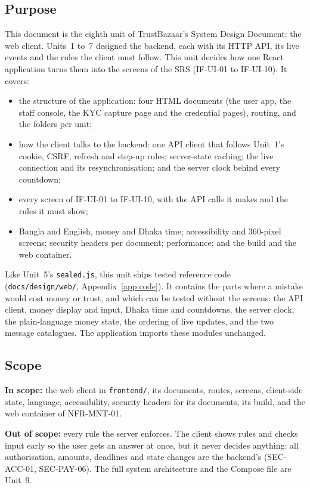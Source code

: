\documentclass[11pt,a4paper]{article}
\begin{document}
\subsection{Purpose}
This document is the eighth unit of TrustBazaar's System Design Document: the web client. Units~1 to~7 designed the backend, each with its HTTP API, its live events and the rules the client must follow. This unit decides how one React application turns them into the screens of the SRS (IF-UI-01 to IF-UI-10). It covers:
\begin{itemize}[nosep]
  \item the structure of the application: four HTML documents (the user app, the staff console, the KYC capture page and the credential pages), routing, and the folders per unit;
  \item how the client talks to the backend: one API client that follows Unit~1's cookie, CSRF, refresh and step-up rules; server-state caching; the live connection and its resynchronisation; and the server clock behind every countdown;
  \item every screen of IF-UI-01 to IF-UI-10, with the API calls it makes and the rules it must show;
  \item Bangla and English, money and Dhaka time; accessibility and 360-pixel screens; security headers per document; performance; and the build and the web container.
\end{itemize}
Like Unit~5's \texttt{sealed.js}, this unit ships tested reference code (\texttt{docs/design/web/}, Appendix~\ref{app:code}). It contains the parts where a mistake would cost money or trust, and which can be tested without the screens: the API client, money display and input, Dhaka time and countdowns, the server clock, the plain-language money state, the ordering of live updates, and the two message catalogues. The application imports these modules unchanged.

\subsection{Scope}
\textbf{In scope:} the web client in \texttt{frontend/}, its documents, routes, screens, client-side state, language, accessibility, security headers for its documents, its build, and the web container of NFR-MNT-01.

\textbf{Out of scope:} every rule the server enforces. The client shows rules and checks input early so the user gets an answer at once, but it never decides anything: all authorisation, amounts, deadlines and state changes are the backend's (SEC-ACC-01, SEC-PAY-06). The full system architecture and the Compose file are Unit~9.
\end{document}

